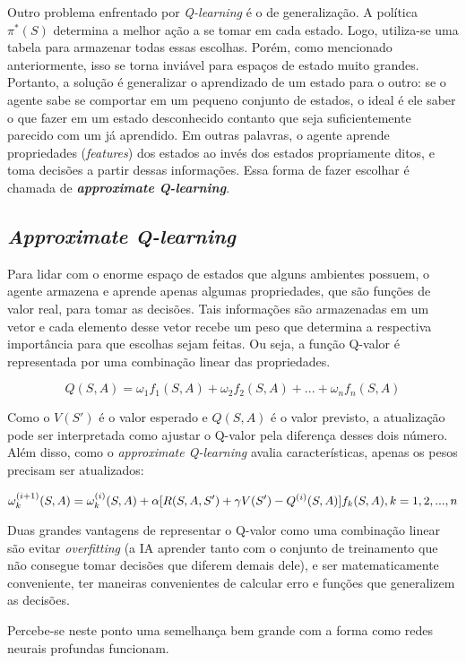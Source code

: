 Outro problema enfrentado por \textit{Q-learning} é o de generalização. A política $\pi^{*}(S)$ determina a melhor ação a se tomar em cada estado. Logo, utiliza-se uma tabela para armazenar todas essas escolhas. Porém, como mencionado anteriormente, isso se torna inviável para espaços de estado muito grandes. Portanto, a solução é generalizar o aprendizado de um estado para o outro: se o agente sabe se comportar em um pequeno conjunto de estados, o ideal é ele saber o que fazer em um estado desconhecido contanto que seja suficientemente parecido com um já aprendido. Em outras palavras, o agente aprende propriedades (\textit{features}) dos estados ao invés dos estados propriamente ditos, e toma decisões a partir dessas informações. Essa forma de fazer escolhar é chamada de \textit{\textbf{approximate Q-learning}}.

\subsection{\textit{Approximate Q-learning}}
\label{sec:aql}

Para lidar com o enorme espaço de estados que alguns ambientes possuem, o agente armazena e aprende apenas algumas propriedades, que são funções de valor real, para tomar as decisões. Tais informações são armazenadas em um vetor e cada elemento desse vetor recebe um peso que determina a respectiva importância para que escolhas sejam feitas. Ou seja, a função Q-valor é representada por uma combinação linear das propriedades.

\begin{equation} \label{eq:q_lin_comb}
Q(S,A) = \omega_{1}f_{1}(S,A) + \omega_{2}f_{2}(S,A) + ... + \omega_{n}f_{n}(S,A)
\end{equation}

Como o $V(S')$ é o valor esperado e $Q(S,A)$ é o valor previsto, a atualização pode ser interpretada como ajustar o Q-valor pela diferença desses dois número. Além disso, como o \textit{approximate Q-learning} avalia características, apenas os pesos precisam ser atualizados:

\begin{equation} \label{eq:w_update}
\omega_{k}^{(i+1)}(S,A) = \omega_{k}^{(i)}(S,A) + \alpha[R(S,A,S') + \gamma V(S') - Q^{(i)}(S,A)]f_{k}(S,A), \hfill k = 1, 2, ..., n
\end{equation}

Duas grandes vantagens de representar o Q-valor como uma combinação linear são evitar \textit{overfitting} (a IA aprender tanto com o conjunto de treinamento que não consegue tomar decisões que diferem demais dele), e ser matematicamente conveniente, ter maneiras convenientes de calcular erro e funções que generalizem as decisões.

Percebe-se neste ponto uma semelhança bem grande com a forma como redes neurais profundas funcionam.
